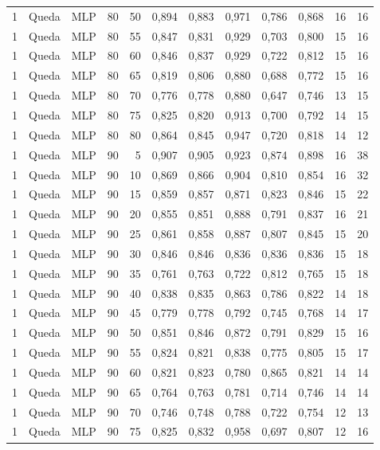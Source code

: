 \begin{longtable}{@{}rllrrrrrrrrr@{}}
1 & Queda & MLP & 80 & 50 & 0,894 & 0,883 & 0,971 & 0,786 & 0,868 & 16 & 16 \\
1 & Queda & MLP & 80 & 55 & 0,847 & 0,831 & 0,929 & 0,703 & 0,800 & 15 & 16 \\
1 & Queda & MLP & 80 & 60 & 0,846 & 0,837 & 0,929 & 0,722 & 0,812 & 15 & 16 \\
1 & Queda & MLP & 80 & 65 & 0,819 & 0,806 & 0,880 & 0,688 & 0,772 & 15 & 16 \\
1 & Queda & MLP & 80 & 70 & 0,776 & 0,778 & 0,880 & 0,647 & 0,746 & 13 & 15 \\
1 & Queda & MLP & 80 & 75 & 0,825 & 0,820 & 0,913 & 0,700 & 0,792 & 14 & 15 \\
1 & Queda & MLP & 80 & 80 & 0,864 & 0,845 & 0,947 & 0,720 & 0,818 & 14 & 12 \\
1 & Queda & MLP & 90 & 5 & 0,907 & 0,905 & 0,923 & 0,874 & 0,898 & 16 & 38 \\
1 & Queda & MLP & 90 & 10 & 0,869 & 0,866 & 0,904 & 0,810 & 0,854 & 16 & 32 \\
1 & Queda & MLP & 90 & 15 & 0,859 & 0,857 & 0,871 & 0,823 & 0,846 & 15 & 22 \\
1 & Queda & MLP & 90 & 20 & 0,855 & 0,851 & 0,888 & 0,791 & 0,837 & 16 & 21 \\
1 & Queda & MLP & 90 & 25 & 0,861 & 0,858 & 0,887 & 0,807 & 0,845 & 15 & 20 \\
1 & Queda & MLP & 90 & 30 & 0,846 & 0,846 & 0,836 & 0,836 & 0,836 & 15 & 18 \\
1 & Queda & MLP & 90 & 35 & 0,761 & 0,763 & 0,722 & 0,812 & 0,765 & 15 & 18 \\
1 & Queda & MLP & 90 & 40 & 0,838 & 0,835 & 0,863 & 0,786 & 0,822 & 14 & 18 \\
1 & Queda & MLP & 90 & 45 & 0,779 & 0,778 & 0,792 & 0,745 & 0,768 & 14 & 17 \\
1 & Queda & MLP & 90 & 50 & 0,851 & 0,846 & 0,872 & 0,791 & 0,829 & 15 & 16 \\
1 & Queda & MLP & 90 & 55 & 0,824 & 0,821 & 0,838 & 0,775 & 0,805 & 15 & 17 \\
1 & Queda & MLP & 90 & 60 & 0,821 & 0,823 & 0,780 & 0,865 & 0,821 & 14 & 14 \\
1 & Queda & MLP & 90 & 65 & 0,764 & 0,763 & 0,781 & 0,714 & 0,746 & 14 & 14 \\
1 & Queda & MLP & 90 & 70 & 0,746 & 0,748 & 0,788 & 0,722 & 0,754 & 12 & 13 \\
1 & Queda & MLP & 90 & 75 & 0,825 & 0,832 & 0,958 & 0,697 & 0,807 & 12 & 16 \\

\end{longtable}
